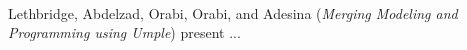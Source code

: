 

\ \hline \ %

Lethbridge, Abdelzad, Orabi, Orabi, and Adesina
\cite{isola-2016-lethbridge}
({\em Merging Modeling and Programming using Umple})
present ...

